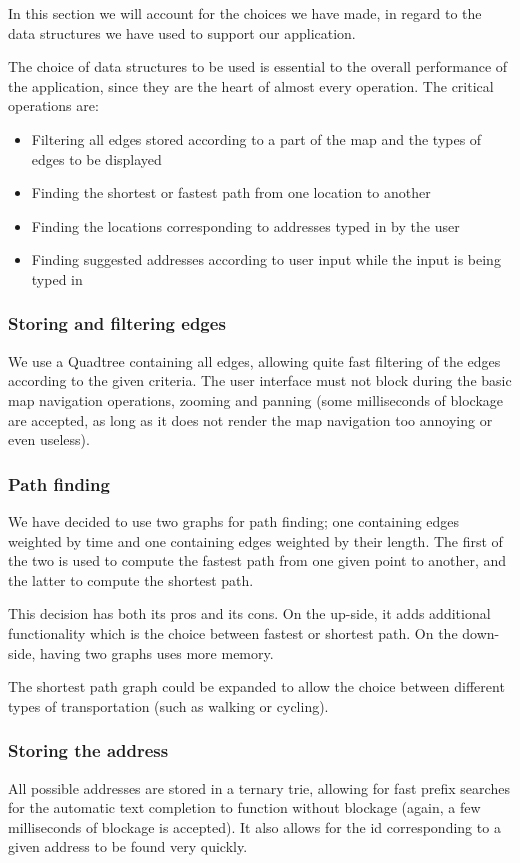 In this section we will account for the choices we have made, in regard to the data structures we have used to support our application.

The choice of data structures to be used is essential to the overall performance of the application, since they are the heart of almost every operation. The critical operations are:
\begin{itemize}
	\item Filtering all edges stored according to a part of the map and the types of edges to be displayed
	\item Finding the shortest or fastest path from one location to another
	\item Finding the locations corresponding to addresses typed in by the user
	\item Finding suggested addresses according to user input while the input is being typed in
\end{itemize}

\subsubsection{Storing and filtering edges}
We use a Quadtree containing all edges, allowing quite fast filtering of the edges according to the given criteria. The user interface must not block during the basic map navigation operations, zooming and panning (some milliseconds of blockage are accepted, as long as it does not render the map navigation too annoying or even useless).

\subsubsection{Path finding}
We have decided to use two graphs for path finding; one containing edges weighted by time and one containing edges weighted by their length. The first of the two is used to compute the fastest path from one given point to another, and the latter  to compute the shortest path.

This decision has both its pros and its cons. On the up-side, it adds additional functionality which is the choice between fastest or shortest path. On the down-side, having two graphs uses more memory.

The shortest path graph could be expanded to allow the choice between different types of transportation (such as walking or cycling).

\subsubsection{Storing the address}
All possible addresses are stored in a ternary trie, allowing for fast prefix searches for the automatic text completion to function without blockage (again, a few milliseconds of blockage is accepted). It also allows for the id corresponding to a given address to be found very quickly.

